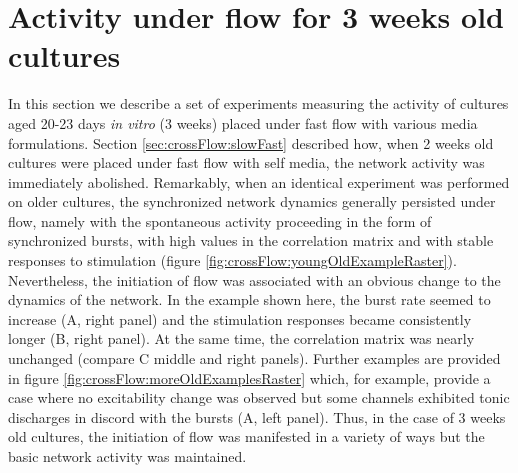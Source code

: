 \section{Activity under flow for 3 weeks old cultures}
\label{sec:crossFlow:oldSelf}
        In this section we describe a set of experiments measuring the activity of cultures aged 20-23 days \textit{in vitro} (3 weeks) placed under fast flow with various media formulations. Section \ref{sec:crossFlow:slowFast} described how, when 2 weeks old cultures were placed under fast flow with self media, the network activity was immediately abolished. Remarkably, when an identical experiment was performed on older cultures, the synchronized network dynamics generally persisted under flow, namely with the spontaneous activity proceeding in the form of synchronized bursts, with high values in the correlation matrix and with stable responses to stimulation (figure \ref{fig:crossFlow:youngOldExampleRaster}). Nevertheless, the initiation of flow was associated with an obvious change to the dynamics of the network. In the example shown here, the burst rate seemed to increase (A, right panel) and the stimulation responses became consistently longer (B, right panel). At the same time, the correlation matrix was nearly unchanged (compare C middle and right panels). Further examples are provided in figure \ref{fig:crossFlow:moreOldExamplesRaster} which, for example, provide a case where no excitability change was observed but some channels exhibited tonic discharges in discord with the bursts (A, left panel). Thus, in the case of 3 weeks old cultures, the initiation of flow was manifested in a variety of ways but the basic network activity was maintained.

